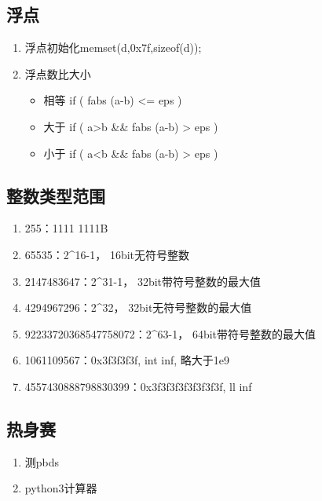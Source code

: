 \subsection{浮点}
  \begin{enumerate}
    \item 浮点初始化memset(d,0x7f,sizeof(d));
    \item 浮点数比大小
      \begin{itemize}
          \item 相等 if ( fabs (a-b) <= eps )
          \item 大于 if ( a>b \&\& fabs (a-b) > eps )
          \item 小于 if ( a<b \&\& fabs (a-b) > eps )
      \end{itemize}
  \end{enumerate}

\subsection{整数类型范围}
  \begin{enumerate}
    \item 255：1111 1111B
    \item 65535：2\^{}16-1， 16bit无符号整数
    \item 2147483647：2\^{}31-1， 32bit带符号整数的最大值
    \item 4294967296：2\^{}32， 32bit无符号整数的最大值
    \item 92233720368547758072：2\^{}63-1， 64bit带符号整数的最大值
    \item 1061109567：0x3f3f3f3f, int inf, 略大于1e9
    \item 4557430888798830399：0x3f3f3f3f3f3f3f3f, ll inf      
  \end{enumerate}

\subsection{热身赛}
  \begin{enumerate}
    \item 测pbds
    \item python3计算器
  \end{enumerate}

